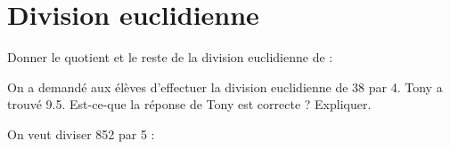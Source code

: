 \section{Division euclidienne}

\begin{questions}
	\question Donner le quotient et le reste de la division euclidienne de :
	

	\question On a demandé aux élèves d'effectuer la division euclidienne de 38 par 4. Tony a trouvé \num{9.5}. Est-ce-que la réponse de Tony est correcte ? Expliquer.
	
	
	\question On veut diviser 852 par 5 :
	
\end{questions}